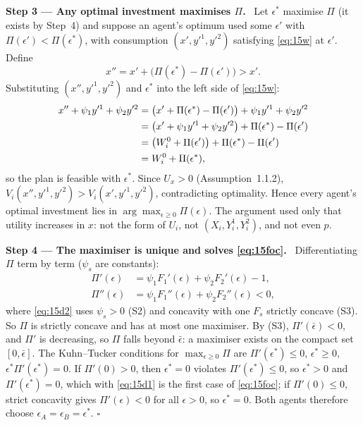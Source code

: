 \documentclass[11pt,a4paper]{article}
\numberwithin{equation}{section}
\newcommand{\step}[2]{\par\medskip\noindent\textbf{Step #1 --- #2.}~}
\begin{document}
\step{3}{Any optimal investment maximises $\Pi$} Let $\epsilon^\ast$ maximise $\Pi$ (it exists by
Step~4) and suppose an agent's optimum used some $\epsilon'$ with $\Pi(\epsilon')<\Pi(\epsilon^\ast)$,
with consumption $(x',y'^1,y'^2)$ satisfying \eqref{eq:15w} at $\epsilon'$. Define
\begin{equation}\label{eq:15dev}
  x'' = x' + \big(\Pi(\epsilon^\ast)-\Pi(\epsilon')\big) > x'.
\end{equation}
Substituting $(x'',y'^1,y'^2)$ and $\epsilon^\ast$ into the left side of \eqref{eq:15w}:
\begin{align}
  x'' + \psi_1y'^1 + \psi_2y'^2 &= \big(x' + \Pi(\epsilon^\ast)-\Pi(\epsilon')\big) + \psi_1y'^1 + \psi_2y'^2 \notag\\
  &= \big(x' + \psi_1y'^1 + \psi_2y'^2\big) + \Pi(\epsilon^\ast) - \Pi(\epsilon') \notag\\
  &= \big(W_i^0 + \Pi(\epsilon')\big) + \Pi(\epsilon^\ast) - \Pi(\epsilon') \notag\\
  &= W_i^0 + \Pi(\epsilon^\ast), \notag
\end{align}
so the plan is feasible with $\epsilon^\ast$. Since $U_x>0$ (Assumption~1.1.2),
$V_i(x'',y'^1,y'^2)>V_i(x',y'^1,y'^2)$, contradicting optimality. Hence every agent's optimal
investment lies in $\arg\max_{\epsilon\ge0}\Pi(\epsilon)$. The argument used only that utility
increases in $x$: not the form of $U_i$, not $(X_i,Y_i^1,Y_i^2)$, and not even $p$.

\step{4}{The maximiser is unique and solves \eqref{eq:15foc}} Differentiating $\Pi$ term by term
($\psi_s$ are constants):
\begin{align}
  \Pi'(\epsilon) &= \psi_1F_1'(\epsilon)+\psi_2F_2'(\epsilon)-1, \label{eq:15d1}\\
  \Pi''(\epsilon) &= \psi_1F_1''(\epsilon)+\psi_2F_2''(\epsilon) < 0, \label{eq:15d2}
\end{align}
where \eqref{eq:15d2} uses $\psi_s>0$ (S2) and concavity with one $F_s$ strictly concave (S3).
So $\Pi$ is strictly concave and has at most one maximiser. By (S3), $\Pi'(\bar\epsilon)<0$, and
$\Pi'$ is decreasing, so $\Pi$ falls beyond $\bar\epsilon$: a maximiser exists on the compact set
$[0,\bar\epsilon]$. The Kuhn--Tucker conditions for $\max_{\epsilon\ge0}\Pi$ are $\Pi'(\epsilon^\ast)\le0$,
$\epsilon^\ast\ge0$, $\epsilon^\ast\Pi'(\epsilon^\ast)=0$. If $\Pi'(0)>0$, then $\epsilon^\ast=0$ violates
$\Pi'(\epsilon^\ast)\le0$, so $\epsilon^\ast>0$ and $\Pi'(\epsilon^\ast)=0$, which with \eqref{eq:15d1}
is the first case of \eqref{eq:15foc}; if $\Pi'(0)\le0$, strict concavity gives $\Pi'(\epsilon)<0$
for all $\epsilon>0$, so $\epsilon^\ast=0$. Both agents therefore choose
$\epsilon_A=\epsilon_B=\epsilon^\ast$. $\square$
\end{document}
